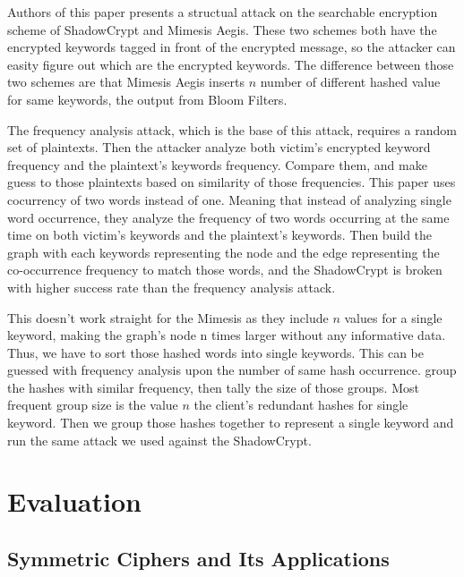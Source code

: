 \documentclass[a4paper]{article}
\begin{document}
Authors of this paper presents a structual attack on the searchable encryption scheme of ShadowCrypt and Mimesis Aegis. These two schemes both have the encrypted keywords tagged in front of the encrypted message, so the attacker can easity figure out which are the encrypted keywords. The difference between those two schemes are that Mimesis Aegis inserts $n$ number of different hashed value for same keywords, the output from Bloom Filters. 
\par The frequency analysis attack, which is the base of this attack, requires a random set of plaintexts. Then the attacker analyze both victim's encrypted keyword frequency and the plaintext's keywords frequency. Compare them, and make guess to those plaintexts based on similarity of those frequencies. This paper uses cocurrency of two words instead of one. Meaning that instead of analyzing single word occurrence, they analyze the frequency of two words occurring at the same time on both victim's keywords and the plaintext's keywords. Then build the graph with each keywords representing the node and the edge representing the co-occurrence frequency to match those words, and the ShadowCrypt is broken with higher success rate than the frequency analysis attack.
\par This doesn't work straight for the Mimesis as they include $n$ values for a single keyword, making the graph's node n times larger without any informative data. Thus, we have to sort those hashed words into single keywords. This can be guessed with frequency analysis upon the number of same hash occurrence. group the hashes with similar frequency, then tally the size of those groups. Most frequent group size is the value $n$ the client's redundant hashes for single keyword. Then we group those hashes together to represent a single keyword and run the same attack we used against the ShadowCrypt.

\section{Evaluation}

\subsection{Symmetric Ciphers and Its Applications}
\end{document}
